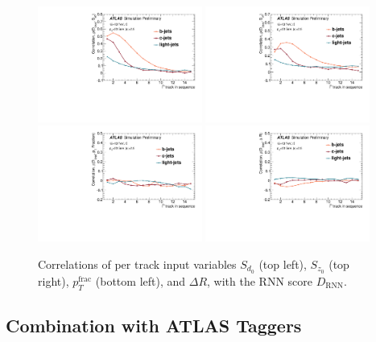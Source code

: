 \begin{figure}[htbp]
  \centering
 \includegraphics[width=0.48\textwidth]{figures/RNN/Corr_Sd0.pdf}
 \includegraphics[width=0.48\textwidth]{figures/RNN/Corr_Sz0.pdf}
 \includegraphics[width=0.48\textwidth]{figures/RNN/Corr_pTFrac.pdf}
 \includegraphics[width=0.48\textwidth]{figures/RNN/Corr_DeltaR.pdf}

\caption{Correlations of per track input variables $S_{d_0}$ (top left), $S_{z_0}$ (top right), $p_T^{\textrm{frac}}$ (bottom left), and $\Delta R$, with the RNN score $D_{\mathrm{RNN}}$.}
  \label{fig:input_output_corrs}
\end{figure}


\subsection{Combination with ATLAS Taggers}

